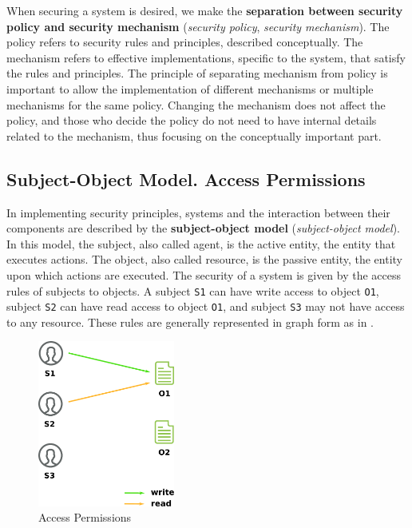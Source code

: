 When securing a system is desired, we make the \textbf{separation between security policy and security mechanism} (\textit{security policy}, \textit{security mechanism}).
The policy refers to security rules and principles, described conceptually.
The mechanism refers to effective implementations, specific to the system, that satisfy the rules and principles.
The principle of separating mechanism from policy is important to allow the implementation of different mechanisms or multiple mechanisms for the same policy.
Changing the mechanism does not affect the policy, and those who decide the policy do not need to have internal details related to the mechanism, thus focusing on the conceptually important part.

\subsection{Subject-Object Model.
Access Permissions}
\label{sec:sec:fundamentals:permissions}

In implementing security principles, systems and the interaction between their components are described by the \textbf{subject-object model} (\textit{subject-object model}).
In this model, the subject, also called agent, is the active entity, the entity that executes actions.
The object, also called resource, is the passive entity, the entity upon which actions are executed.
The security of a system is given by the access rules of subjects to objects.
A subject \texttt{S1} can have write access to object \texttt{O1}, subject \texttt{S2} can have read access to object \texttt{O1}, and subject \texttt{S3} may not have access to any resource.
These rules are generally represented in graph form as in .

\begin{figure}[htbp]
  \centering
  \def\svgwidth{\columnwidth}
  \includegraphics[width=0.4\textwidth]{chapters/12-auth/img/access-permissions.svg.pdf}
  \caption{Access Permissions}
  \label{fig:sec:access-permissions}
\end{figure}

